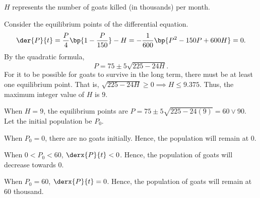 \begin{solution}
    \begin{ppart}
    $H$ represents the number of goats killed (in thousands) per month.
    \end{ppart}
    \begin{ppart}
        Consider the equilibrium points of the differential equation. \[\der{P}{t} = \frac{P}{4} \bp{1 - \frac{P}{150}} - H = -\frac{1}{600} \bp{P^2 - 150P + 600H} = 0.\] By the quadratic formula, \[P = 75 \pm 5 \sqrt{225 - 24H}.\] For it to be possible for goats to survive in the long term, there must be at least one equilibrium point. That is, $\sqrt{225 - 24H} \geq 0 \implies H \leq 9.375$. Thus, the maximum integer value of $H$ is $9$.
    \end{ppart}
    \begin{ppart}
        When $H = 9$, the equilibrium points are $P = 75 \pm 5\sqrt{225 - 24(9)} = 60 \lor 90$. Let the initial population be $P_0$.

        \begin{center}
        \end{center}

        When $P_0 = 0$, there are no goats initially. Hence, the population will remain at 0.

        When $0 < P_0 < 60$, $\derx{P}{t} < 0$. Hence, the population of goats will decrease towards 0.

        When $P_0 = 60$, $\derx{P}{t} = 0$. Hence, the population of goats will remain at 60 thousand.


\end{ppart}
\end{solution}
